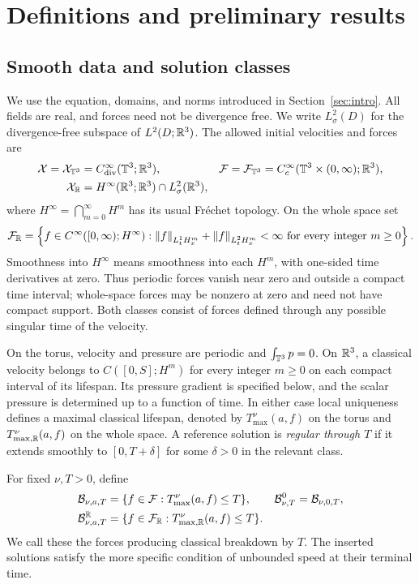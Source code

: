 \section{Definitions and preliminary results}\label{sec:preliminaries}
\subsection{Smooth data and solution classes}
We use the equation, domains, and norms introduced in
Section~\ref{sec:intro}.
All fields are real, and forces need not be divergence free. We write
$L^2_\sigma(D)$ for the divergence-free subspace of $L^2(D;\mathbb R^3)$.
The allowed initial velocities and forces are
\begin{align}
 \mathcal X=\mathcal X_{\mathbb T^3}&=C^\infty_{\mathrm{div}}(\mathbb T^3;\mathbb R^3),&
 \mathcal F=\mathcal F_{\mathbb T^3}&=C_c^\infty(\mathbb T^3\times(0,\infty);\mathbb R^3),
 \label{eq:inputspaces}\\
 \mathcal X_{\mathbb R}&=H^\infty(\mathbb R^3;\mathbb R^3)\cap L^2_\sigma(\mathbb R^3),
 \label{eq:Rinitial}
\end{align}
where $H^\infty=\bigcap_{m=0}^\infty H^m$ has its usual Fr\'echet topology.
On the whole space set
\begin{equation}\label{eq:Rclasses}
 \mathcal F_{\mathbb R}=\left\{f\in C^\infty([0,\infty);H^\infty):
 \left\lVert f\right\rVert_{L^1_tH^m_x}+\left\lVert f\right\rVert_{L^2_tH^m_x}<\infty
 \text{ for every integer }m\ge0\right\}.
\end{equation}
Smoothness into $H^\infty$ means smoothness into each $H^m$, with
one-sided time derivatives at zero. Thus periodic forces vanish near zero
and outside a compact time interval; whole-space forces may be nonzero at
zero and need not have compact support. Both classes consist of forces
defined through any possible singular time of the velocity.

On the torus, velocity and pressure are periodic and $\int_{\mathbb T^3}p=0$.
On $\mathbb R^3$, a classical velocity belongs to $C([0,S];H^m)$ for every
integer $m\ge0$ on each compact interval of its lifespan. Its pressure
gradient is specified below, and the scalar pressure is determined up to
a function of time. In either case local uniqueness defines a maximal
classical lifespan, denoted by $T^\nu_{\max}(a,f)$ on the torus and
$T^\nu_{\max,\mathbb R}(a,f)$ on the whole space. A reference solution is
\emph{regular through $T$} if it extends smoothly to $[0,T+\delta]$
for some $\delta>0$ in the relevant class.

For fixed $\nu,T>0$, define
\begin{align}
 \mathcal B_{\nu,a,T}&=\{f\in\mathcal F:T^\nu_{\max}(a,f)\le T\},&
 \mathcal B^0_{\nu,T}&=\mathcal B_{\nu,0,T},\label{eq:singularforces}\\
 \mathcal B^\mathbb R_{\nu,a,T}
 &=\{f\in\mathcal F_{\mathbb R}:T^\nu_{\max,\mathbb R}(a,f)\le T\}.
 \label{eq:Rsingularforces}
\end{align}
We call these the forces producing classical breakdown by $T$.
The inserted solutions satisfy the more specific condition of unbounded
speed at their terminal time.

